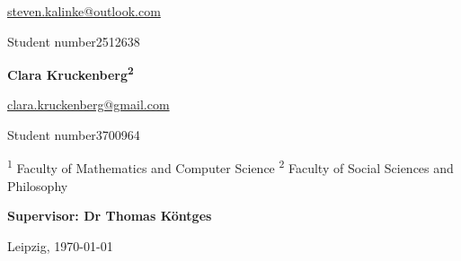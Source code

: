 \begin{titlepage}
\begin{center}
\begin{minipage}[t]{.6\textwidth}
		\begin{normalsize}
			\href{mailto:steven.kalinke@outlook.com}{steven.kalinke@outlook.com}
			
			\libertineLF
			{\footnotesize Student number\enspace{}2512638} \vspace*{1cm}
		\end{normalsize}
	\end{minipage}%
	\begin{minipage}[t]{.4\textwidth}
		\large{\textbf{Clara Kruckenberg\textsuperscript{2}}} \vspace*{0.3cm}
		
		\begin{normalsize}
			\href{clara.kruckenberg@gmail.com}{clara.kruckenberg@gmail.com} %
			
			\libertineLF
			{\footnotesize Student number\enspace{}3700964} \vspace*{0.1cm}
		\end{normalsize}
	\end{minipage}


	\end{center}


	\noindent
	{\footnotesize \textsuperscript{1} Faculty of Mathematics and Computer Science \quad{}\textsuperscript{2} Faculty of Social Sciences and Philosophy} \vspace*{1cm}
	
	\noindent
	\textbf{{\large Supervisor: Dr Thomas Köntges}} \vspace*{0.5cm}
	
	\noindent
	{\small Leipzig, \today}
	
	
\end{titlepage}